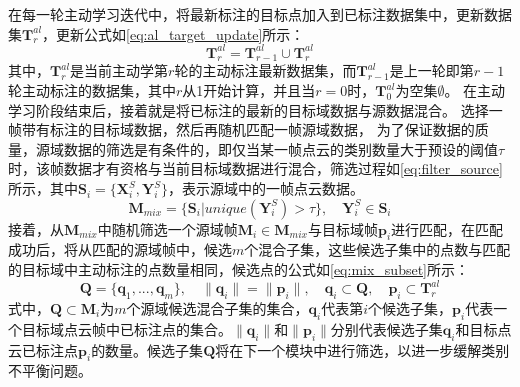     在每一轮主动学习迭代中，将最新标注的目标点加入到已标注数据集中，更新数据集$\mathbf{T}^{al}_r$，更新公式如\eqref{eq:al_target_update}所示：
    \begin{equation}
        \label{eq:al_target_update}
        \mathbf{T}^{al}_r = \mathbf{T}^{al}_{r-1} \cup \mathbf{T}^{al}_r 
    \end{equation}
    其中，$\mathbf{T}^{al}_r$是当前主动学第$r$轮的主动标注最新数据集，而$\mathbf{T}^{al}_{r-1}$是上一轮即第$r-1$轮主动标注的数据集，其中$r$从1开始计算，并且当$r=0$时，$\mathbf{T}^{al}_0$为空集$\emptyset$。
    在主动学习阶段结束后，接着就是将已标注的最新的目标域数据与源数据混合。
    选择一帧带有标注的目标域数据，然后再随机匹配一帧源域数据，
    为了保证数据的质量，源域数据的筛选是有条件的，即仅当某一帧点云的类别数量大于预设的阈值$\tau$时，该帧数据才有资格与当前目标域数据进行混合，筛选过程如\eqref{eq:filter_source}所示，其中$\mathbf{S}_i = \{\mathbf{X}^S_i,\mathbf{Y}^S_i\}$，表示源域中的一帧点云数据。
    \begin{equation}
        \label{eq:filter_source}
        \mathbf{M}_{mix}= \{\mathbf{S}_i | unique(\mathbf{Y}^S_i)> \tau\}, \quad \mathbf{Y}^S_i \in \mathbf{S}_i
    \end{equation}
    接着，从$\mathbf{M}_{mix}$中随机筛选一个源域帧$\mathbf{M}_i \in \mathbf{M}_{mix}$与目标域帧$\mathbf{p}_i$进行匹配，在匹配成功后，将从匹配的源域帧中，候选$m$个混合子集，这些候选子集中的点数与匹配的目标域中主动标注的点数量相同，候选点的公式如\eqref{eq:mix_subset}所示：
    \begin{equation}
        \label{eq:mix_subset}
        \mathbf{Q} = \{\mathbf{q}_1,...,\mathbf{q}_m\}, 
        \quad
        \|\mathbf{q}_i\| = \|\mathbf{p}_i\|,
        \quad
        \mathbf{q}_i \subset \mathbf{Q},
        \quad
        \mathbf{p}_i \subset \mathbf{T}^{al}_r
    \end{equation}
    式中，$\mathbf{Q} \subset \mathbf{M}_i$为$m$个源域候选混合子集的集合，$\mathbf{q}_i$代表第$i$个候选子集，$\mathbf{p}_i$代表一个目标域点云帧中已标注点的集合。$\|\mathbf{q}_i\|$和$\|\mathbf{p}_i\|$分别代表候选子集$\mathbf{q}_i$和目标点云已标注点$\mathbf{p}_i$的数量。候选子集$\mathbf{Q}$将在下一个模块中进行筛选，以进一步缓解类别不平衡问题。

